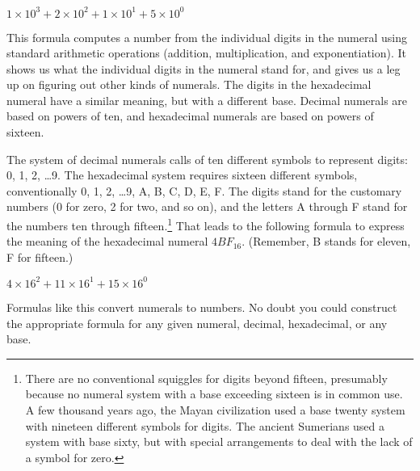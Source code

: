 \begin{center}
$1 \times 10^3 + 2 \times 10^2 + 1 \times 10^1 + 5 \times 10^0$
\end{center}

This formula computes a number from the individual digits
in the numeral using standard arithmetic operations
(addition, multiplication, and exponentiation).
It shows us what the individual digits in the numeral stand for,
and gives us a leg up on figuring out other kinds of numerals.
The digits in the hexadecimal numeral have a similar meaning,
but with a different base. Decimal numerals are based on
powers of ten, and hexadecimal numerals are based on powers of sixteen.

The system of decimal numerals calls of ten different symbols to represent digits:
0, 1, 2, \dots 9.
The hexadecimal system requires sixteen different symbols, conventionally
0, 1, 2, \dots 9, A, B, C, D, E, F.
The digits stand for the customary numbers
(0 for zero, 2 for two, and so on),
and the letters A through F
stand for the numbers ten through fifteen.\footnote{There
are no conventional squiggles for digits beyond fifteen,
presumably because no numeral system
with a base exceeding sixteen is in common use.
A few thousand years ago, the Mayan civilization used a base twenty system
with nineteen different symbols for digits.
The ancient Sumerians used a system with base sixty,
but with special arrangements to deal with the lack of a symbol for zero.}
That leads to the following
formula to express the meaning of the hexadecimal numeral $4BF_{16}$.
(Remember, B stands for eleven, F for fifteen.)
\begin{center}
$4 \times 16^2 + 11 \times 16^1 + 15 \times 16^0$
\end{center}
Formulas like this
convert numerals to numbers.
No doubt you could construct the appropriate formula
for any given numeral, decimal, hexadecimal, or any base.

